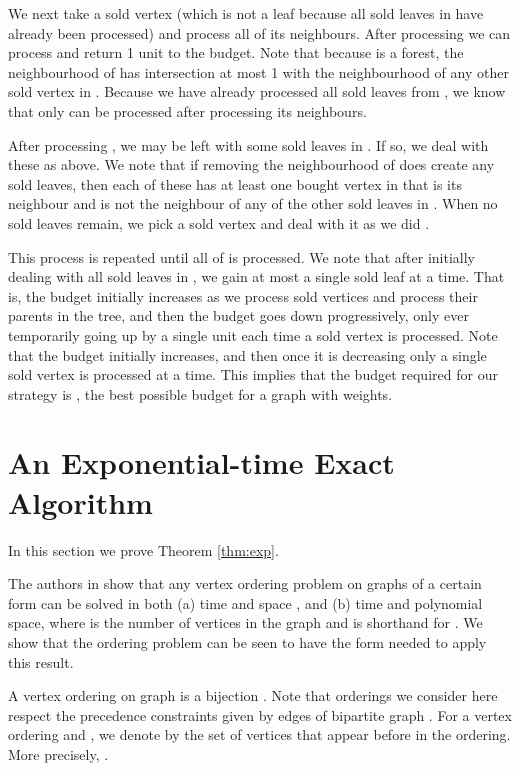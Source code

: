 \documentclass[letterpaper,11pt,abstracton]{scrartcl}
\begin{document}
We next take a sold vertex  (which is not a leaf because all sold
leaves in  have already been processed) and process all of its neighbours.  After processing
 we can process  and return 1 unit to the budget.  Note that because
 is a forest, the neighbourhood of  has intersection at most 1 with the
neighbourhood of any other sold vertex in .  Because we have already processed all
sold leaves from , we know that only  can be processed after processing
its neighbours.

After processing , we may be left with some sold leaves in .  If so,
we deal with these as above.  We note that if removing the neighbourhood of
 does create any sold leaves, then each of these has at least one
bought vertex in  that is its neighbour and is not the neighbour of any of the other
sold leaves in .  When no sold leaves remain, we pick a
sold vertex  and deal with it as we did .

This process is repeated until all of  is processed.  We note that after initially
dealing with all sold leaves in , we gain at most a single sold leaf at a time.
That is, the budget initially increases as we process sold vertices and process their
parents in the tree, and then the budget goes down progressively, only ever
temporarily going up by a single unit each time a sold vertex is processed.
Note that the budget initially increases, and then once it is decreasing
only a single sold vertex is processed at a time.  This implies that the budget required
for our strategy is , the best possible budget for a graph with
 weights.






\section{An Exponential-time Exact Algorithm}\label{sec:exp}
In this section we prove Theorem \ref{thm:exp}.

The authors in \cite{BFKKT} show that any vertex ordering problem on
graphs of a certain form can be solved in both (a) time and space
, and (b) time  and polynomial space, where  is
the number of vertices in the graph and  is shorthand for
.  We show that the ordering
problem can be seen to have the form needed to apply this result.

A vertex ordering on graph  is a bijection .
Note that orderings we consider here respect the precedence
constraints given by edges of bipartite graph .
For a vertex
ordering  and , we denote by  the
set of vertices that appear before  in the ordering.  More
precisely, .
\end{document}

